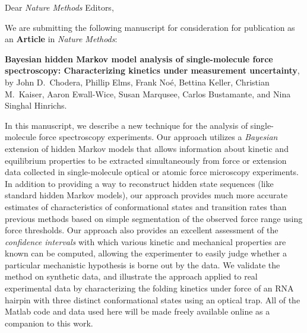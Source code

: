 \documentclass[ucb,qb3,10pt,fullfrom]{ucletter}
\date{\today}
\begin{document}
\begin{letter}{}
\opening{Dear \emph{Nature Methods} Editors,}

We are submitting the following manuscript for consideration for publication as an {\bf Article} in \emph{Nature Methods}:

{\bf Bayesian hidden Markov model analysis of single-molecule force spectroscopy: Characterizing kinetics under measurement uncertainty}, by John D.~Chodera, Phillip Elms, Frank No\'{e}, Bettina Keller, Christian M.~Kaiser, Aaron Ewall-Wice,  Susan Marqusee, Carlos Bustamante, and Nina Singhal Hinrichs.

In this manuscript, we describe a new technique for the analysis of single-molecule force spectroscopy experiments.
Our approach utilizes a \emph{Bayesian} extension of hidden Markov models that allows information about kinetic and equilibrium properties to be extracted simultaneously from force or extension data collected in single-molecule optical or atomic force microscopy experiments.
In addition to providing a way to reconstruct hidden state sequences (like standard hidden Markov models), our approach provides much more accurate estimates of characteristics of conformational states and transition rates than previous methods based on simple segmentation of the observed force range using force thresholds.
Our approach also provides an excellent assessment of the \emph{confidence intervals} with which various kinetic and mechanical properties are known can be computed, allowing the experimenter to easily judge whether a particular mechanistic hypothesis is borne out by the data.
We validate the method on synthetic data, and illustrate the approach applied to real experimental data by characterizing the folding kinetics under force of an RNA hairpin with three distinct conformational states using an optical trap.
All of the Matlab code and data used here will be made freely available online as a companion to this work.


\end{letter}
\end{document}
